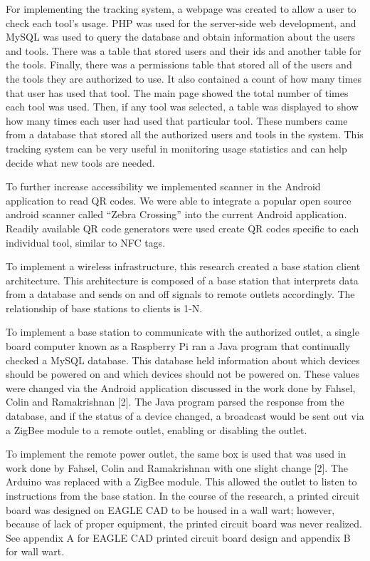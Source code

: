 \documentclass{sigchi}
\begin{document}
For implementing the tracking system, a webpage was created to allow a user to check each tool’s usage. PHP was used for the server-side web development, and MySQL was used to query the database and obtain information about the users and tools. There was a table that stored users and their ids and another table for the tools. Finally, there was a permissions table that stored all of the users and the tools they are authorized to use. It also contained a count of how many times that user has used that tool. The main page showed the total number of times each tool was used. Then, if any tool was selected, a table was displayed to show how many times each user had used that particular tool. These numbers came from a database that stored all the authorized users and tools in the system. This tracking system can be very useful in monitoring usage statistics and can help decide what new tools are needed.

To  further increase accessibility we implemented scanner in the Android application to read QR codes. We were able to integrate a popular open source android scanner called “Zebra Crossing” into the current Android application. Readily available QR code generators were used create QR codes specific to each individual tool, similar to NFC tags. 

To implement a wireless infrastructure, this research created a base station client architecture. This architecture is composed of a base station that interprets data from a database and sends on and off signals to remote outlets accordingly. The relationship of base stations to clients is 1-N. 

To implement a base station to communicate with the authorized outlet, a single board computer known as a Raspberry Pi ran a Java program that continually checked a MySQL database. This database held information about which devices should be powered on and which devices should not be powered on. These values were changed via the Android application discussed in the work done by Fahsel, Colin and Ramakrishnan [2]. The Java program parsed the response from the database, and if the status of a device changed, a broadcast would be sent out via a ZigBee module to a remote outlet, enabling or disabling the outlet.  

To implement the remote power outlet, the same box is used that was used in work done by  Fahsel, Colin and Ramakrishnan with one slight change [2]. The Arduino was replaced with a ZigBee module. This allowed the outlet to listen to instructions from the base station. In the course of the research, a printed circuit board was designed on EAGLE CAD to be housed in a wall wart; however, because of lack of proper equipment, the printed circuit board was never realized. See appendix A for EAGLE CAD printed circuit board design and appendix B for wall wart.
\end{document}
